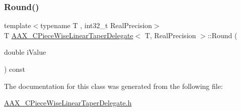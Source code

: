 \mbox{\label{a01553_a6ec8cca43a67762239bb3bc123f4a7f5}} 
\subsubsection{\texorpdfstring{Round()}{Round()}}
{\footnotesize\ttfamily template$<$typename T , int32\+\_\+t Real\+Precision$>$ \\
T \mbox{\hyperlink{a01553}{A\+A\+X\+\_\+\+C\+Piece\+Wise\+Linear\+Taper\+Delegate}}$<$ T, Real\+Precision $>$\+::Round (\begin{DoxyParamCaption}\item[{double}]{i\+Value }\end{DoxyParamCaption}) const\hspace{0.3cm}{\ttfamily [protected]}}



The documentation for this class was generated from the following file\+:\begin{DoxyCompactItemize}
\item 
\mbox{\hyperlink{a00464}{A\+A\+X\+\_\+\+C\+Piece\+Wise\+Linear\+Taper\+Delegate.\+h}}\end{DoxyCompactItemize}
